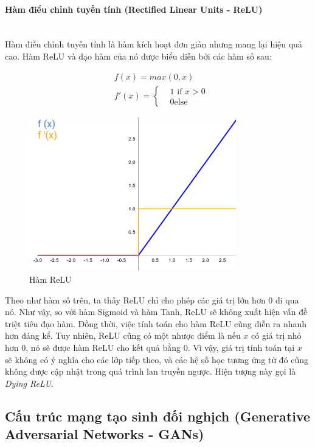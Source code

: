 \paragraph{Hàm điểu chỉnh tuyến tính (Rectified Linear Units - ReLU)}\mbox{}\\

Hàm điều chỉnh tuyến tính là hàm kích hoạt đơn giản nhưng mang lại hiệu quả cao. Hàm ReLU và đạo hàm của nó được biểu diễn bởi các hàm số sau:

\begin{equation}
\begin{split}
    & f(x) = max(0,x)\\
    & f'(x) = 
        \begin{cases}
            & 1 \text{ if } x>0\\
            & 0 \text{else}
        \end{cases}
\end{split}
\end{equation}

\begin{figure}[H]
    \centering
    \includegraphics[width=9cm]{./content/materials/relu.png}
    \caption{Hàm ReLU}
\end{figure}

Theo như hàm số trên, ta thấy ReLU chỉ cho phép các giá trị lớn hơn 0 đi qua nó. Như vậy, so với hàm Sigmoid và hàm Tanh, ReLU sẽ không xuất hiện vấn đề triệt tiêu đạo hàm. Đồng thời, việc tính toán cho hàm ReLU cũng diễn ra nhanh hơn đáng kể. Tuy nhiên, ReLU cũng có một nhược điểm là nếu $x$ có giá trị nhỏ hơn 0, nó sẽ được hàm ReLU cho kết quả bằng 0. Vì vậy, giá trị tính toán tại $x$ sẽ không có ý nghĩa cho các lớp tiếp theo, và các hệ số học tương ứng từ đó cũng không được cập nhật trong quá trình lan truyền ngược. Hiện tượng này gọi là \textit{Dying ReLU}.

\subsection{Cấu trúc mạng tạo sinh đối nghịch (Generative Adversarial Networks - GANs)}

